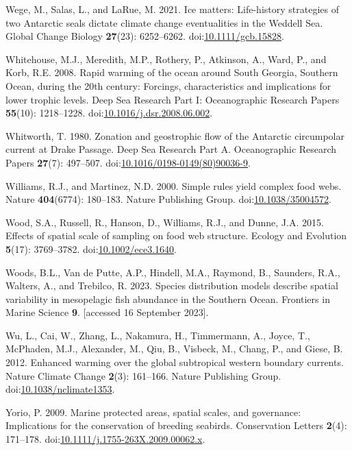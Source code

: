 \documentclass[
]{article}
\newlength{\cslhangindent}
\newenvironment{CSLReferences}[2] %
 {\begin{list}{}{%
  \setlength{\itemindent}{0pt}
  \setlength{\leftmargin}{0pt}
  \setlength{\parsep}{0pt}
  \ifodd #1
   \setlength{\leftmargin}{\cslhangindent}
   \setlength{\itemindent}{-1\cslhangindent}
  \fi
  \setlength{\itemsep}{#2\baselineskip}}}
 {\end{list}}
\begin{document}
\begin{CSLReferences}{1}{0}
Wege, M., Salas, L., and LaRue, M. 2021. Ice matters: {Life-history}
strategies of two {Antarctic} seals dictate climate change eventualities
in the {Weddell Sea}. Global Change Biology \textbf{27}(23): 6252--6262.
doi:\href{https://doi.org/10.1111/gcb.15828}{10.1111/gcb.15828}.

Whitehouse, M.J., Meredith, M.P., Rothery, P., Atkinson, A., Ward, P.,
and Korb, R.E. 2008. Rapid warming of the ocean around {South Georgia},
{Southern Ocean}, during the 20th century: {Forcings}, characteristics
and implications for lower trophic levels. Deep Sea Research Part I:
Oceanographic Research Papers \textbf{55}(10): 1218--1228.
doi:\href{https://doi.org/10.1016/j.dsr.2008.06.002}{10.1016/j.dsr.2008.06.002}.

Whitworth, T. 1980. Zonation and geostrophic flow of the {Antarctic}
circumpolar current at {Drake Passage}. Deep Sea Research Part A.
Oceanographic Research Papers \textbf{27}(7): 497--507.
doi:\href{https://doi.org/10.1016/0198-0149(80)90036-9}{10.1016/0198-0149(80)90036-9}.

Williams, R.J., and Martinez, N.D. 2000. Simple rules yield complex food
webs. Nature \textbf{404}(6774): 180--183. Nature Publishing Group.
doi:\href{https://doi.org/10.1038/35004572}{10.1038/35004572}.

Wood, S.A., Russell, R., Hanson, D., Williams, R.J., and Dunne, J.A.
2015. Effects of spatial scale of sampling on food web structure.
Ecology and Evolution \textbf{5}(17): 3769--3782.
doi:\href{https://doi.org/10.1002/ece3.1640}{10.1002/ece3.1640}.

Woods, B.L., Van de Putte, A.P., Hindell, M.A., Raymond, B., Saunders,
R.A., Walters, A., and Trebilco, R. 2023. Species distribution models
describe spatial variability in mesopelagic fish abundance in the
{Southern Ocean}. Frontiers in Marine Science \textbf{9}. {[}accessed 16
September 2023{]}.

Wu, L., Cai, W., Zhang, L., Nakamura, H., Timmermann, A., Joyce, T.,
McPhaden, M.J., Alexander, M., Qiu, B., Visbeck, M., Chang, P., and
Giese, B. 2012. Enhanced warming over the global subtropical western
boundary currents. Nature Climate Change \textbf{2}(3): 161--166. Nature
Publishing Group.
doi:\href{https://doi.org/10.1038/nclimate1353}{10.1038/nclimate1353}.

Yorio, P. 2009. Marine protected areas, spatial scales, and governance:
Implications for the conservation of breeding seabirds. Conservation
Letters \textbf{2}(4): 171--178.
doi:\href{https://doi.org/10.1111/j.1755-263X.2009.00062.x}{10.1111/j.1755-263X.2009.00062.x}.

\end{CSLReferences}
\end{document}
